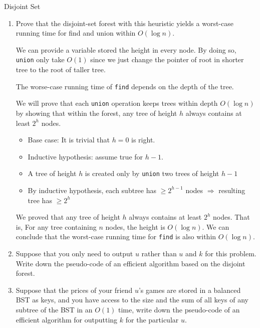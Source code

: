 \begin{homeworkProblem}{Disjoint Set}
    \begin{enumerate}[label=(\arabic*)]
        \item
            Prove that the disjoint-set forest with this heuristic yields a 
            worst-case running time for find and union within $O(\log n)$.

            We can provide a variable stored the height in every node. By doing 
            so, \texttt{union} only take $O(1)$ since we just change the pointer
            of root in shorter tree to the root of taller tree.

            The worse-case running time of \texttt{find} depends on the depth of 
            the tree.

            We will prove that each \texttt{union} operation keeps trees within 
            depth $O(\log n)$ by showing that within the forest, any tree of 
            height $h$ always contains at least $2^h$ nodes.

            \begin{itemize}
                \item Base case: It is trivial that $h = 0$ is right.
                \item Inductive hypothesis: assume true for $h - 1$. 
                \item A tree of height $h$ is created only by \texttt{union}
                    two trees of height $h - 1$
                \item By inductive hypothesis, each subtree has $\geq 2^{h-1}$
                    nodes $\Rightarrow$ resulting tree has $\geq 2^{h}$
            \end{itemize}

            We proved that any tree of height $h$ always contains at least $2^h$
            nodes. That is, For any tree containing $n$ nodes, the height is 
            $O(\log n)$. We can conclude that the worst-case running time for
            \texttt{find} is also within $O(\log n)$.

        \item
            Suppose that you only need to output $u$ rather than $u$ and $k$ for
            this problem. Write down the pseudo-code of an efficient algorithm
            based on the disjoint forest.

            \pending

            \pagebreak
        \item
            Suppose that the prices of your friend $u$'s games are stored in a
            balanced BST as keys, and you have access to the size and the sum of
            all keys of any subtree of the BST in an $O(1)$ time, write down the
            pseudo-code of an efficient algorithm for outputting $k$ for the 
            particular $u$.


\end{enumerate}
\end{homeworkProblem}

